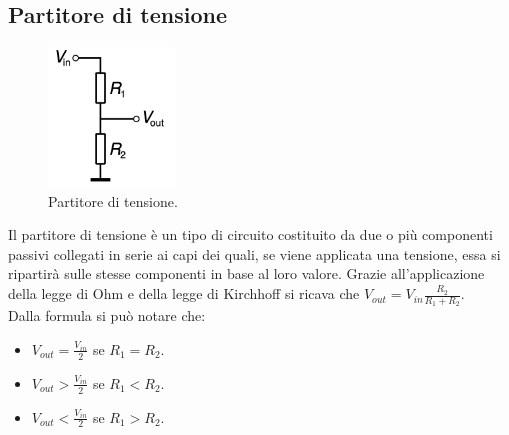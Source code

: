 \documentclass[12pt,oneside,a4paper]{article}
\begin{document}
\subsection{Partitore di tensione}
\begin{figure}[ht!]
    \centering
    \includegraphics[width=0.3\textwidth]{figures/partitore_tensione.png}
    \caption{Partitore di tensione.}
\end{figure}
Il partitore di tensione\cite{VoltageDivider} è un tipo di circuito costituito da due o più componenti passivi collegati in serie ai capi dei quali, se viene applicata una tensione, essa si ripartirà sulle stesse componenti in base al loro valore.
Grazie all'applicazione della legge di Ohm e della legge di Kirchhoff si ricava che $V_{out} = V_{in} \frac{R_2}{R_1 + R_2}$.
\\Dalla formula si può notare che:
\begin{itemize}
    \item $V_{out} = \frac{V_{in}}{2}$ se $R_1 = R_2$.
    \item $V_{out} > \frac{V_{in}}{2}$ se $R_1 < R_2$.
    \item $V_{out} < \frac{V_{in}}{2}$ se $R_1 > R_2$.
\end{itemize}
\end{document}
